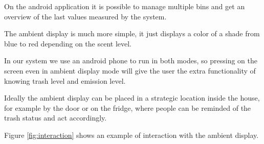 On the android application it is possible to manage multiple bins and get an overview of the last values measured by the system.

The ambient display is much more simple, it just displays a color of a shade from blue to red depending on the scent level.

In our system we use an android phone to run in both modes, so pressing on the screen even in ambient display mode will give the user the extra functionality of knowing trash level and emission level.

Ideally the ambient display can be placed in a strategic location inside the house, for example by the door or on the fridge, where people can be reminded of the trash status and act accordingly.

Figure \ref{fig:interaction} shows an example of interaction with the ambient display.

